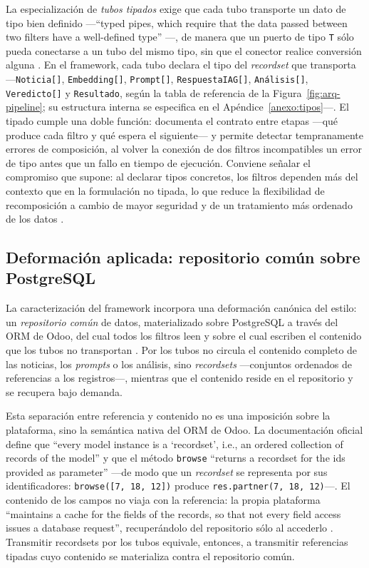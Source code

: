 \documentclass[12pt]{report}
\begin{document}
La especialización de \textit{tubos tipados} exige que cada tubo transporte un dato de tipo bien definido ---``typed pipes, which require that the data passed between two filters have a well-defined type'' \citep{garlanshaw:1994}---, de manera que un puerto de tipo \texttt{T} sólo pueda conectarse a un tubo del mismo tipo, sin que el conector realice conversión alguna \citep[\S3.12.2]{cristia:2025}. En el framework, cada tubo declara el tipo del \textit{recordset} que transporta ---\texttt{Noticia[]}, \texttt{Embedding[]}, \texttt{Prompt[]}, \texttt{RespuestaIAG[]}, \texttt{Análisis[]}, \texttt{Veredicto[]} y \texttt{Resultado}, según la tabla de referencia de la Figura~\ref{fig:arq-pipeline}; su estructura interna se especifica en el Apéndice~\ref{anexo:tipos}---. El tipado cumple una doble función: documenta el contrato entre etapas ---qué produce cada filtro y qué espera el siguiente--- y permite detectar tempranamente errores de composición, al volver la conexión de dos filtros incompatibles un error de tipo antes que un fallo en tiempo de ejecución. Conviene señalar el compromiso que supone: al declarar tipos concretos, los filtros dependen más del contexto que en la formulación no tipada, lo que reduce la flexibilidad de recomposición a cambio de mayor seguridad y de un tratamiento más ordenado de los datos \citep[\S3.12.2]{cristia:2025}.

\subsection{Deformación aplicada: repositorio común sobre PostgreSQL}
\label{sec:arq-car-repositorio}

La caracterización del framework incorpora una deformación canónica del estilo: un \textit{repositorio común} de datos, materializado sobre PostgreSQL a través del ORM de Odoo, del cual todos los filtros leen y sobre el cual escriben el contenido que los tubos no transportan \citep[\S3.13.1]{cristia:2025}. Por los tubos no circula el contenido completo de las noticias, los \textit{prompts} o los análisis, sino \textit{recordsets} ---conjuntos ordenados de referencias a los registros---, mientras que el contenido reside en el repositorio y se recupera bajo demanda.

Esta separación entre referencia y contenido no es una imposición sobre la plataforma, sino la semántica nativa del ORM de Odoo. La documentación oficial define que ``every model instance is a `recordset', i.e., an ordered collection of records of the model'' y que el método \texttt{browse} ``returns a recordset for the ids provided as parameter'' ---de modo que un \textit{recordset} se representa por sus identificadores: \texttt{browse([7, 18, 12])} produce \texttt{res.partner(7, 18, 12)}---. El contenido de los campos no viaja con la referencia: la propia plataforma ``maintains a cache for the fields of the records, so that not every field access issues a database request'', recuperándolo del repositorio sólo al accederlo \citep{odoo-orm}. Transmitir recordsets por los tubos equivale, entonces, a transmitir referencias tipadas cuyo contenido se materializa contra el repositorio común.
\end{document}
